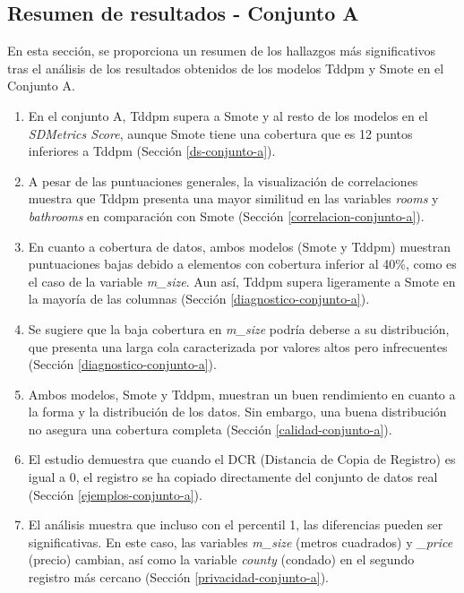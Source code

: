 \subsection{Resumen de resultados - Conjunto A}
En esta sección, se proporciona un resumen de los hallazgos más significativos tras el análisis de los resultados obtenidos de los modelos Tddpm y Smote en el Conjunto A.
\begin{enumerate}

    \item En el conjunto A, Tddpm supera a Smote y al resto de los modelos en el \emph{SDMetrics Score}, aunque Smote tiene una cobertura que es 12 puntos inferiores a Tddpm (Sección \ref{ds-conjunto-a}).
    
    \item A pesar de las puntuaciones generales, la visualización de correlaciones muestra que Tddpm presenta una mayor similitud en las variables \emph{rooms} y \emph{bathrooms} en comparación con Smote (Sección \ref{correlacion-conjunto-a}).
    
    \item En cuanto a cobertura de datos, ambos modelos (Smote y Tddpm) muestran puntuaciones bajas debido a elementos con cobertura inferior al 40\%, como es el caso de la variable \emph{m\_size}. Aun así, Tddpm supera ligeramente a Smote en la mayoría de las columnas (Sección \ref{diagnostico-conjunto-a}).
    
    \item Se sugiere que la baja cobertura en \emph{m\_size} podría deberse a su distribución, que presenta una larga cola caracterizada por valores altos pero infrecuentes (Sección \ref{diagnostico-conjunto-a}).
    
    \item Ambos modelos, Smote y Tddpm, muestran un buen rendimiento en cuanto a la forma y la distribución de los datos. Sin embargo, una buena distribución no asegura una cobertura completa (Sección \ref{calidad-conjunto-a}).
    
    \item El estudio demuestra que cuando el DCR (Distancia de Copia de Registro) es igual a 0, el registro se ha copiado directamente del conjunto de datos real (Sección \ref{ejemplos-conjunto-a}).
    
    \item El análisis muestra que incluso con el percentil 1, las diferencias pueden ser significativas. En este caso, las variables \emph{m\_size} (metros cuadrados) y \emph{\_price} (precio) cambian, así como la variable \emph{county} (condado) en el segundo registro más cercano (Sección \ref{privacidad-conjunto-a}).
    

\end{enumerate}
